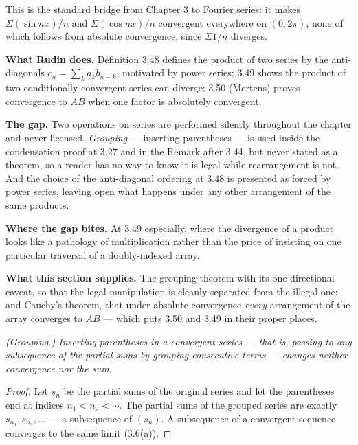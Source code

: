 \noindent
This is the standard bridge from Chapter 3 to Fourier series: it makes
$\Sigma (\sin nx)/n$ and $\Sigma (\cos nx)/n$ convergent everywhere on
$(0,2\pi)$, none of which follows from absolute convergence, since
$\Sigma 1/n$ diverges.


\begin{roadmap}
\raggedright
\textbf{What Rudin does.} Definition 3.48 defines the product of two series
by the anti-diagonals $c_n = \sum_k a_kb_{n-k}$, motivated by power series;
3.49 shows the product of two conditionally convergent series can diverge;
3.50 (Mertens) proves convergence to $AB$ when one factor is absolutely
convergent.

\smallskip
\textbf{The gap.} Two operations on series are performed silently throughout
the chapter and never licensed. \emph{Grouping} --- inserting parentheses ---
is used inside the condensation proof at 3.27 and in the Remark after 3.44,
but never stated as a theorem, so a reader has no way to know it is legal
while rearrangement is not. And the choice of the anti-diagonal ordering at
3.48 is presented as forced by power series, leaving open what happens under
any other arrangement of the same products.

\smallskip
\textbf{Where the gap bites.} At 3.49 especially, where the divergence of a
product looks like a pathology of multiplication rather than the price of
insisting on one particular traversal of a doubly-indexed array.

\smallskip
\textbf{What this section supplies.} The grouping theorem with its
one-directional caveat, so that the legal manipulation is cleanly separated
from the illegal one; and Cauchy's theorem, that under absolute convergence
\emph{every} arrangement of the array converges to $AB$ --- which puts 3.50
and 3.49 in their proper places.
\end{roadmap}

\emph{(Grouping.) Inserting parentheses in a convergent series ---
that is, passing to any subsequence of the partial sums by grouping
consecutive terms --- changes neither convergence nor the sum.}
\begin{proof}
Let $s_n$ be the partial sums of the original series and let the parentheses
end at indices $n_1 < n_2 < \cdots$. The partial sums of the grouped series
are exactly $s_{n_1}, s_{n_2}, \dots$ --- a subsequence of $(s_n)$. A
subsequence of a convergent sequence converges to the same limit (3.6(a)).
\end{proof}

